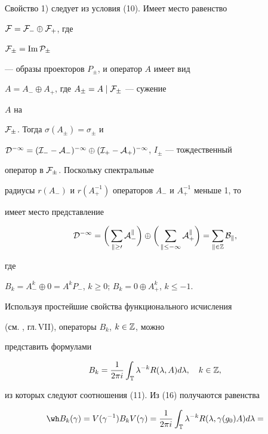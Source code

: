 \begin{pf} Свойство 1) следует из условия (10). Имеет место равенство 


$\cal F=\cal F_-\oplus\cal F_+$, где 


$\cal F_\pm=\operatorname{Im} P_\pm$ 


--- образы проекторов $P_\pm$, и оператор $A$ имеет вид 


$A=A_-\oplus A_+$, где $A_\pm=A\mid\cal F_\pm$ --- сужение 


$A$ на 


$\cal F_\pm$. Тогда $\sigma(A_\pm)=\sigma_\pm$ и 


$\cal D^{-1}=(I_--A_-)^{-1}\oplus(I_+-A_+)^{-1}$, $I_\pm$ --- тождественный 


оператор в $\cal F_\pm$. Поскольку спектральные 


радиусы $r(A_-)$ и $r(A_+^{-1})$ операторов $A_-$ и $A_+^{-1}$ меньше 1, то 


имеет место представление 


\begin{equation} 


\cal D^{-1}=\biggl(\,\sum_{k\ge 0}A_-^k\biggr)\oplus 


\biggl(\,\sum_{k\le -1}A_+^k\biggr)=\sum_{k\in\Bbb Z}B_k, 


\end{equation} 


где 


$B_k=A_-^k\oplus 0=A^kP_-$, $k\ge 0$; $B_k=0\oplus A_+^k$, $k\le -1$. 


Используя простейшие свойства функционального исчисления 


(см. \cite{Dun}, гл.\,VII), операторы $B_k$, $k\in\Bbb Z$, можно 


представить формулами 


\begin{equation} 


B_k=\frac{1}{2\pi i}\int_{\Bbb T}\lambda^{-k}R(\lambda,A)d\lambda, 


\quad k\in\Bbb Z, 


\end{equation} 


из которых следуют соотношения (11). Из (16) получаются равенства 


\begin{gather*} 


\wh B_k(\gamma)=V(\gamma^{-1})B_kV(\gamma)=\frac{1}{2\pi i} 


\int_{\Bbb T}\lambda^{-k}R(\lambda,\gamma(g_0)A)d\lambda=\\ 



\end{gather*}
\end{pf}
